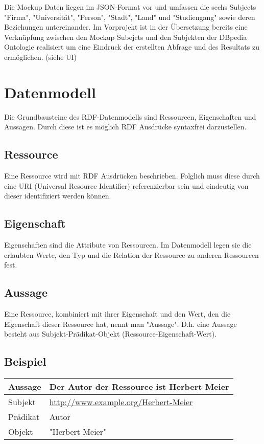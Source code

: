 Die Mockup Daten liegen im JSON-Format vor und umfassen die sechs Subjects "Firma", "Universität", "Person", "Stadt", "Land" und "Studiengang" sowie deren Beziehungen untereinander.
Im Vorprojekt ist in der Übersetzung bereits eine Verknüpfung zwischen den Mockup Subejcts und den Subjekten der DBpedia Ontologie realisiert um eine Eindruck der erstellten Abfrage und des Resultats zu ermöglichen. (siehe UI)

\section{Datenmodell}

Die Grundbausteine des RDF-Datenmodells sind Ressourcen, Eigenschaften und Aussagen. Durch diese ist es möglich RDF Ausdrücke syntaxfrei darzustellen.

\subsection{Ressource}

Eine Ressource wird mit RDF Ausdrücken beschrieben. Folglich muss diese durch eine URI (Universal Resource Identifier) referenzierbar sein und eindeutig von dieser identifiziert werden können.

\subsection{Eigenschaft}

Eigenschaften sind die Attribute von Ressourcen. Im Datenmodell legen sie die erlaubten Werte, den Typ und die Relation der Ressource zu anderen Ressourcen fest.

\subsection{Aussage}

Eine Ressource, kombiniert mit ihrer Eigenschaft und den Wert, den die Eigenschaft dieser Ressource hat, nennt man "Aussage". D.h. eine Aussage besteht aus Subjekt-Prädikat-Objekt (Ressource-Eigenschaft-Wert).

\subsection{Beispiel}

\begin{tabular}{l l}
Aussage  & Der Autor der Ressource ist Herbert Meier \\\midrule
Subjekt  & \url{http://www.example.org/Herbert-Meier} \\
Prädikat & Autor \\
Objekt   & "Herbert Meier"
\end{tabular}

